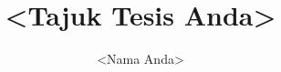 \documentclass[bahasam]{GayaUKM}
\title{<Tajuk Tesis Anda>}
\author{<Nama Anda>}
\begin{document}
\maketitle

\frontmatter
\declaration








\tableofcontents\clearpage
\listoffigures\clearpage
\listoftables\clearpage




\mainmatter







\appendix


\end{document}
